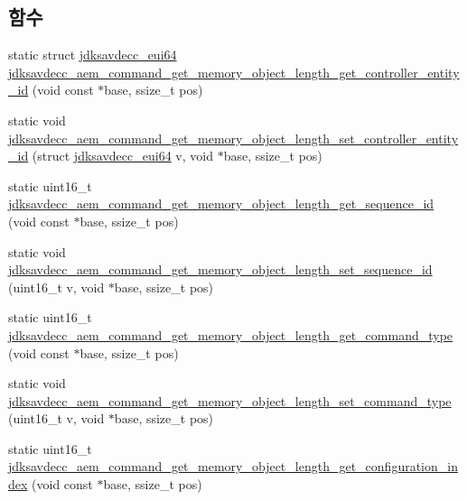 \subsection*{함수}
\begin{DoxyCompactItemize}
\item 
static struct \hyperlink{structjdksavdecc__eui64}{jdksavdecc\+\_\+eui64} \hyperlink{group__command__get__memory__object__length_gac45d6d47e1f4e07c0c3016ea041eaa14}{jdksavdecc\+\_\+aem\+\_\+command\+\_\+get\+\_\+memory\+\_\+object\+\_\+length\+\_\+get\+\_\+controller\+\_\+entity\+\_\+id} (void const $\ast$base, ssize\+\_\+t pos)
\item 
static void \hyperlink{group__command__get__memory__object__length_gaaee8d7456887a8e75fd896c5df8fa297}{jdksavdecc\+\_\+aem\+\_\+command\+\_\+get\+\_\+memory\+\_\+object\+\_\+length\+\_\+set\+\_\+controller\+\_\+entity\+\_\+id} (struct \hyperlink{structjdksavdecc__eui64}{jdksavdecc\+\_\+eui64} v, void $\ast$base, ssize\+\_\+t pos)
\item 
static uint16\+\_\+t \hyperlink{group__command__get__memory__object__length_gaa13d71b37fc8d7408dd283dcdf354ab5}{jdksavdecc\+\_\+aem\+\_\+command\+\_\+get\+\_\+memory\+\_\+object\+\_\+length\+\_\+get\+\_\+sequence\+\_\+id} (void const $\ast$base, ssize\+\_\+t pos)
\item 
static void \hyperlink{group__command__get__memory__object__length_gacf759057e3283b97fd7a994eef07a42c}{jdksavdecc\+\_\+aem\+\_\+command\+\_\+get\+\_\+memory\+\_\+object\+\_\+length\+\_\+set\+\_\+sequence\+\_\+id} (uint16\+\_\+t v, void $\ast$base, ssize\+\_\+t pos)
\item 
static uint16\+\_\+t \hyperlink{group__command__get__memory__object__length_ga2b5e3e425224548831c5a254e36b6be7}{jdksavdecc\+\_\+aem\+\_\+command\+\_\+get\+\_\+memory\+\_\+object\+\_\+length\+\_\+get\+\_\+command\+\_\+type} (void const $\ast$base, ssize\+\_\+t pos)
\item 
static void \hyperlink{group__command__get__memory__object__length_ga1c9d685e9170ba7c3caaaeba92d29d54}{jdksavdecc\+\_\+aem\+\_\+command\+\_\+get\+\_\+memory\+\_\+object\+\_\+length\+\_\+set\+\_\+command\+\_\+type} (uint16\+\_\+t v, void $\ast$base, ssize\+\_\+t pos)
\item 
static uint16\+\_\+t \hyperlink{group__command__get__memory__object__length_ga4355991c4c60807bc7b75ae37f167028}{jdksavdecc\+\_\+aem\+\_\+command\+\_\+get\+\_\+memory\+\_\+object\+\_\+length\+\_\+get\+\_\+configuration\+\_\+index} (void const $\ast$base, ssize\+\_\+t pos)
\item 

\end{DoxyCompactItemize}
